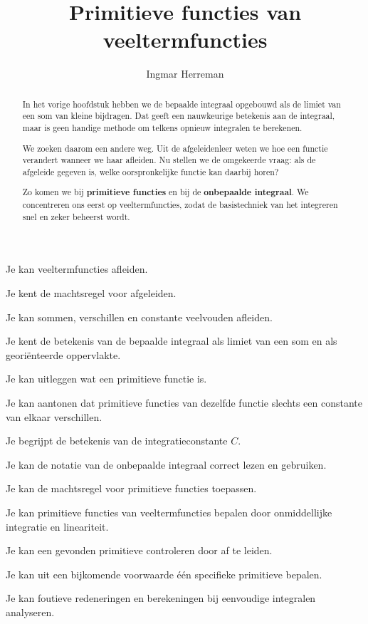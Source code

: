 \documentclass{ximera}
\title{Primitieve functies van veeltermfuncties}
\author{Ingmar Herreman}
\begin{document}











\begin{abstract}
In het vorige hoofdstuk hebben we de bepaalde integraal opgebouwd als
de limiet van een som van kleine bijdragen. Dat geeft een nauwkeurige
betekenis aan de integraal, maar is geen handige methode om telkens
opnieuw integralen te berekenen.

We zoeken daarom een andere weg. Uit de afgeleidenleer weten we hoe een
functie verandert wanneer we haar afleiden. Nu stellen we de omgekeerde
vraag: als de afgeleide gegeven is, welke oorspronkelijke functie kan
daarbij horen?

Zo komen we bij \textbf{primitieve functies} en bij de
\textbf{onbepaalde integraal}. We concentreren ons eerst op
veeltermfuncties, zodat de basistechniek van het integreren snel en
zeker beheerst wordt.
\end{abstract}

\maketitle

\begin{voorkennis}
  \item Je kan veeltermfuncties afleiden.
  \item Je kent de machtsregel voor afgeleiden.
  \item Je kan sommen, verschillen en constante veelvouden afleiden.
  \item Je kent de betekenis van de bepaalde integraal als limiet van een som en als georiënteerde oppervlakte.
\end{voorkennis}

\begin{leerdoelen}
  \item Je kan uitleggen wat een primitieve functie is.
  \item Je kan aantonen dat primitieve functies van dezelfde functie slechts een constante van elkaar verschillen.
  \item Je begrijpt de betekenis van de integratieconstante \(C\).
  \item Je kan de notatie van de onbepaalde integraal correct lezen en gebruiken.
  \item Je kan de machtsregel voor primitieve functies toepassen.
  \item Je kan primitieve functies van veeltermfuncties bepalen door onmiddellijke integratie en lineariteit.
  \item Je kan een gevonden primitieve controleren door af te leiden.
  \item Je kan uit een bijkomende voorwaarde één specifieke primitieve bepalen.
  \item Je kan foutieve redeneringen en berekeningen bij eenvoudige integralen analyseren.
\end{leerdoelen}
\end{document}
